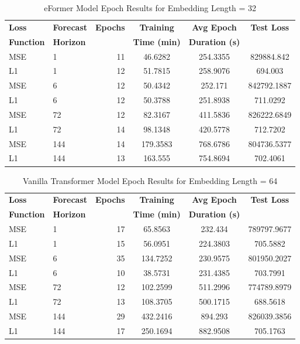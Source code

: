 \documentclass{article}
\begin{document}
\begin{table}[!htbp]
    \footnotesize
    \centering
    \caption{eFormer Model Epoch Results for Embedding Length = 32}
    \begin{tabular}{l|l|r|S|S|S}
        \toprule
        \textbf{Loss} & \textbf{Forecast} & \textbf{Epochs} & \textbf{Training} & \textbf{Avg Epoch} & \textbf{Test Loss} \\
        \textbf{Function} & \textbf{Horizon} & & \textbf{Time (min)} & \textbf{Duration (s)} & \\
        \midrule
        MSE & 1 & 11 & 46.6282 & 254.3355 & 829884.842 \\
        L1 & 1 & 12 & 51.7815 & 258.9076 & 694.003 \\
        \midrule
        MSE & 6 & 12 & 50.4342 & 252.171 & 842792.1887 \\
        L1 & 6 & 12 & 50.3788 & 251.8938 & 711.0292 \\
        \midrule
        MSE & 72 & 12 & 82.3167 & 411.5836 & 826222.6849 \\
        L1 & 72 & 14 & 98.1348 & 420.5778 & 712.7202 \\
        \midrule
        MSE & 144 & 14 & 179.3583 & 768.6786 & 804736.5377 \\
        L1 & 144 & 13 & 163.555 & 754.8694 & 702.4061 \\
    \bottomrule
    \end{tabular}
    \label{tab:eformer_epoch_emb32}
\end{table}

\begin{table}[!htbp]
    \footnotesize
    \centering
    \caption{Vanilla Transformer Model Epoch Results for Embedding Length = 64}
    \begin{tabular}{l|l|r|S|S|S}
        \toprule
        \textbf{Loss} & \textbf{Forecast} & \textbf{Epochs} & \textbf{Training} & \textbf{Avg Epoch} & \textbf{Test Loss} \\
        \textbf{Function} & \textbf{Horizon} & & \textbf{Time (min)} & \textbf{Duration (s)} & \\
        \midrule
            MSE & 1 & 17 & 65.8563 & 232.434 & 789797.9677 \\
        L1 & 1 & 15 & 56.0951 & 224.3803 & 705.5882 \\
        \midrule
        MSE & 6 & 35 & 134.7252 & 230.9575 & 801950.2027 \\
        L1 & 6 & 10 & 38.5731 & 231.4385 & 703.7991 \\
        \midrule
        MSE & 72 & 12 & 102.2599 & 511.2996 & 774789.8979 \\
        L1 & 72 & 13 & 108.3705 & 500.1715 & 688.5618 \\
        \midrule
        MSE & 144 & 29 & 432.2416 & 894.293 & 826039.3856 \\
        L1 & 144 & 17 & 250.1694 & 882.9508 & 705.1763 \\
    \bottomrule
    \end{tabular}
    \label{tab:vanillatransformer_epoch_emb64}
\end{table}
\end{document}
